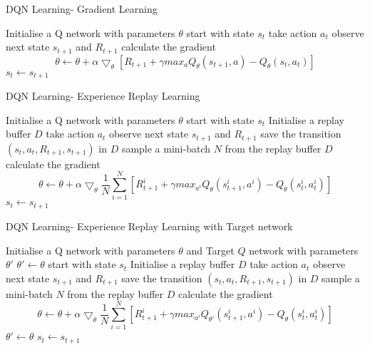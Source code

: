 \documentclass[../main.tex]{subfiles}
\begin{document}
\begin{algorithm}
    \caption{DQN Learning- Gradient Learning}\label{alg:dqn}
    \begin{algorithmic}
    \State Initialise a Q network  with parameters $\theta$
    \State start with state $s_t$
    \State take action $a_t$ 
    \State observe next state $s_{t+1}$ and $R_{t+1}$
    \State calculate the gradient $$ \theta \leftarrow \theta + \alpha \bigtriangledown_\theta \left[ R_{t+1} + \gamma \textit{max}_{a} Q_\theta(s_{t+1}, a ) - Q_\theta(s_t, a_t) \right]$$
    \State $s_t \leftarrow s_{t+1}$
    \EndWhile
    \end{algorithmic}
    \end{algorithm}
    
    
    \begin{algorithm}
    \caption{DQN Learning- Experience Replay Learning}\label{alg:dqn_ex_replay}
    \begin{algorithmic}
    \State Initialise a Q network  with parameters $\theta$
    \State start with state $s_t$
    \State Initialise a replay buffer $D$
    \State take action $a_t$ 
    \State observe next state $s_{t+1}$ and $R_{t+1}$
    \State save the transition $(s_t, a_t, R_{t+1}, s_{t+1})$ in $D$
    \State sample a mini-batch $N$ from the replay buffer $D$
    \State calculate the gradient $$ \theta \leftarrow \theta + \alpha \bigtriangledown_\theta \frac{1}{N}\sum\limits_{i=1}^N \left[ R_{t+1}^i + \gamma \textit{max}_{a^i} Q_\theta(s_{t+1}^i, a^i ) - Q_\theta(s_t^i, a_t^i) \right]$$
    \EndWhile
    \State $s_t \leftarrow s_{t+1}$
    \EndWhile
    \end{algorithmic}
    \end{algorithm}
    
    
    
    \begin{algorithm}
    \caption{DQN Learning- Experience Replay Learning with Target network}\label{alg:dqn_ex_replay_with_target}
    \begin{algorithmic}
    \State Initialise a Q network  with parameters $\theta$ and Target $Q$ network with parameters $\theta'$
    \State $\theta' \leftarrow \theta$
    \State start with state $s_t$
    \State Initialise a replay buffer $D$
    \State take action $a_t$ 
    \State observe next state $s_{t+1}$ and $R_{t+1}$
    \State save the transition $(s_t, a_t, R_{t+1}, s_{t+1})$ in $D$
    \State sample a mini-batch $N$ from the replay buffer $D$
    \State calculate the gradient $$ \theta \leftarrow \theta + \alpha \bigtriangledown_\theta \frac{1}{N}\sum\limits_{i=1}^N \left[ R_{t+1}^i + \gamma \textit{max}_{a^i} Q_{\theta'}(s_{t+1}^i, a^i ) - Q_\theta(s_t^i, a_t^i) \right]$$
    \EndWhile
    \State $\theta' \leftarrow \theta$
    \State $s_t \leftarrow s_{t+1}$
    \EndWhile
    \end{algorithmic}
    \end{algorithm}
    
    \newpage
    
\end{document}
